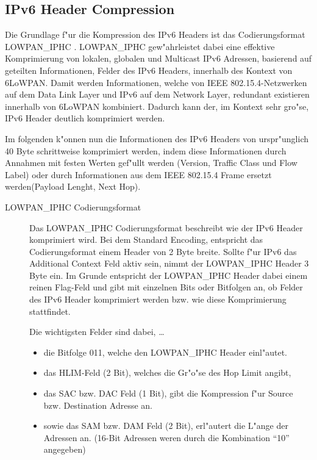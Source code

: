 \documentclass[final]{lktseminar}
\begin{document}
\subsection{IPv6 Header Compression}
\label{sec: IPv6 Header Compression}

Die Grundlage f"ur die Kompression des IPv6 Headers ist das Codierungsformat LOWPAN\_IPHC \cite{rfc6282}.
LOWPAN\_IPHC gew"ahrleistet dabei eine effektive Komprimierung von lokalen, globalen und Multicast IPv6 Adressen,
basierend auf geteilten Informationen, Felder des IPv6 Headers, innerhalb des Kontext von 6LoWPAN.
Damit werden Informationen, welche von IEEE 802.15.4-Netzwerken auf dem Data Link Layer und IPv6 auf dem Network Layer,
redundant existieren innerhalb von 6LoWPAN kombiniert. Dadurch kann der, im Kontext sehr gro"se, IPv6 Header
deutlich komprimiert werden.

Im folgenden k"onnen nun die Informationen des IPv6 Headers von urspr"unglich 40 Byte schrittweise komprimiert werden,
indem diese Informationen durch Annahmen mit festen Werten gef"ullt werden (Version, Traffic Class und Flow Label)
oder durch Informationen aus dem IEEE 802.15.4 Frame ersetzt werden(Payload Lenght, Next Hop).

\begin{description}
    \item[LOWPAN\_IPHC Codierungsformat] Das LOWPAN\_IPHC Codierungsformat beschreibt wie der IPv6 Header komprimiert wird.
    Bei dem Standard Encoding, entspricht das Codierungsformat einem Header von 2 Byte breite.
    Sollte f"ur IPv6 das Additional Context Feld aktiv sein, nimmt der LOWPAN\_IPHC Header 3 Byte ein.
    Im Grunde entspricht der LOWPAN\_IPHC Header dabei einem reinen Flag-Feld und gibt mit einzelnen Bits oder Bitfolgen an,
    ob Felder des IPv6 Header komprimiert werden bzw. wie diese Komprimierung stattfindet.

    Die wichtigsten Felder sind dabei, \dots
    \begin{itemize}
        \item die Bitfolge 011, welche den LOWPAN\_IPHC Header einl"autet.
        \item das HLIM-Feld (2 Bit), welches die Gr"o"se des Hop Limit angibt,
        \item das SAC bzw. DAC Feld (1 Bit), gibt die Kompression f"ur Source bzw. Destination Adresse an.
        \item sowie das SAM bzw. DAM Feld (2 Bit), erl"autert die L"ange der Adressen an.
        (16-Bit Adressen weren durch die Kombination ``10'' angegeben)
    \end{itemize}
\end{description}
\end{document}
